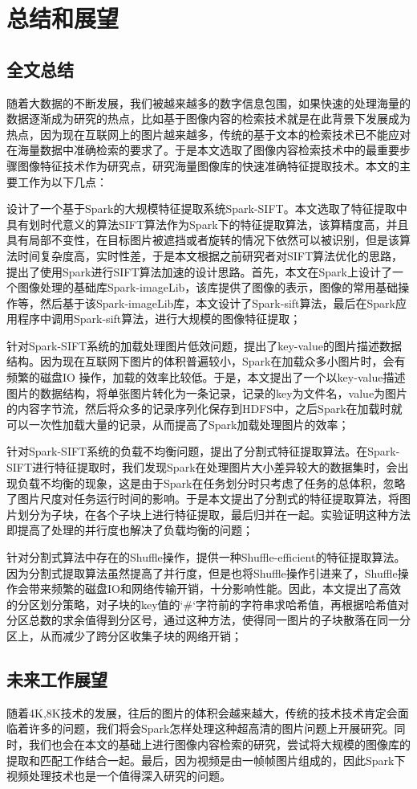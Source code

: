 ﻿\chapter{总结和展望}
\section{全文总结}
随着大数据的不断发展，我们被越来越多的数字信息包围，如果快速的处理海量的数据逐渐成为研究的热点，比如基于图像内容的检索技术就是在此背景下发展成为热点，因为现在互联网上的图片越来越多，传统的基于文本的检索技术已不能应对在海量数据中准确检索的要求了。于是本文选取了图像内容检索技术中的最重要步骤图像特征技术作为研究点，研究海量图像库的快速准确特征提取技术。本文的主要工作为以下几点：
\begin{compactenum}
\item 设计了一个基于Spark的大规模特征提取系统Spark-SIFT。本文选取了特征提取中具有划时代意义的算法SIFT算法作为Spark下的特征提取算法，该算精度高，并且具有局部不变性，在目标图片被遮挡或者旋转的情况下依然可以被识别，但是该算法时间复杂度高，实时性差，于是本文根据之前研究者对SIFT算法优化的思路，提出了使用Spark进行SIFT算法加速的设计思路。首先，本文在Spark上设计了一个图像处理的基础库Spark-imageLib，该库提供了图像的表示，图像的常用基础操作等，然后基于该Spark-imageLib库，本文设计了Spark-sift算法，最后在Spark应用程序中调用Spark-sift算法，进行大规模的图像特征提取；
\item 针对Spark-SIFT系统的加载处理图片低效问题，提出了key-value的图片描述数据结构。因为现在互联网下图片的体积普遍较小，Spark在加载众多小图片时，会有频繁的磁盘IO 操作，加载的效率比较低。于是，本文提出了一个以key-value描述图片的数据结构，将单张图片转化为一条记录，记录的key为文件名，value为图片的内容字节流，然后将众多的记录序列化保存到HDFS中，之后Spark在加载时就可以一次性加载大量的记录，从而提高了Spark加载处理图片的效率；
\item 针对Spark-SIFT系统的负载不均衡问题，提出了分割式特征提取算法。在Spark-SIFT进行特征提取时，我们发现Spark在处理图片大小差异较大的数据集时，会出现负载不均衡的现象，这是由于Spark在任务划分时只考虑了任务的总体积，忽略了图片尺度对任务运行时间的影响。于是本文提出了分割式的特征提取算法，将图片划分为子块，在各个子块上进行特征提取，最后归并在一起。实验证明这种方法即提高了处理的并行度也解决了负载均衡的问题；
\item 针对分割式算法中存在的Shuffle操作，提供一种Shuffle-efficient的特征提取算法。因为分割式提取算法虽然提高了并行度，但是也将Shuffle操作引进来了，Shuffle操作会带来频繁的磁盘IO和网络传输开销，十分影响性能。因此，本文提出了高效的分区划分策略，对子块的key值的`\#`字符前的字符串求哈希值，再根据哈希值对分区总数的求余值得到分区号，通过这种方法，使得同一图片的子块散落在同一分区上，从而减少了跨分区收集子块的网络开销；
\end{compactenum}
\section{未来工作展望}
随着4K,8K技术的发展，往后的图片的体积会越来越大，传统的技术技术肯定会面临着许多的问题，我们将会Spark怎样处理这种超高清的图片问题上开展研究。同时，我们也会在本文的基础上进行图像内容检索的研究，尝试将大规模的图像库的提取和匹配工作结合一起。最后，因为视频是由一帧帧图片组成的，因此Spark下视频处理技术也是一个值得深入研究的问题。
